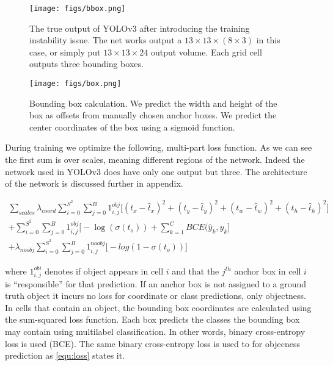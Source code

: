 \bigskip
\begin{figure}[!htbp]
  \centering
  \texttt{[image: figs/bbox.png]}
  \caption[The true output of YOLOv3]{The true output of YOLOv3 after introducing the training instability issue. The net works output a $ 13 \times 13 \times (8 \times 3)$ in this case, or simply put $13 \times 13 \times 24$ output volume. Each grid cell outputs three bounding boxes.}\label{fig:true_yolo_output}
\end{figure}

\begin{figure}[H]
  \centering
  \texttt{[image: figs/box.png]}
  \caption[Bounding box calculation]{Bounding box calculation. We predict the width and height of the box as offsets from manually chosen anchor boxes. We predict the center
    coordinates of the box using a sigmoid function.}\label{fig:bbox_calculation}
\end{figure}

During training we optimize the following, multi-part loss function. As we can see the first sum is over scales, meaning different regions of the network. Indeed the network used in YOLOv3 does have only one output but three. The architecture of the network is discussed further in appendix.

\begin{multline}
  \label{equ:loss}
  \sum_{scales} \lambda_{coord} \sum_{i=0}^{S^2}  \sum_{j=0}^{B} {1}^{obj}_{i,j}  \big[ (t_x - \hat{t}_x)^2  +  (t_y - \hat{t}_y)^2  +  (t_w - \hat{t}_w)^2  +  (t_h - \hat{t}_h)^2  \big] \\
+ \sum_{i=0}^{S^2}  \sum_{j=0}^{B} {1}^{obj}_{i,j} \big[ - \log(\sigma(t_o))  + \sum_{k=1}^{C} BCE(\hat{y}_k, y_k \big]   \\
+ \lambda_{noobj} \sum_{i=0}^{S^2}  \sum_{j=0}^{B} {1}^{noobj}_{i,j}  \big[ -log(1-\sigma(t_o))  \big]
\end{multline}

where $1^{obi}_{i, j}$ denotes if object appears in cell $i$ and that the $j^{th}$ anchor box in cell $i$ is “responsible” for that prediction.
If an anchor box is not assigned to a ground truth object it incurs no loss for coordinate or class predictions, only objectness.
In cells that contain an object, the bounding box coordinates are calculated using the sum-squared loss function.
Each box predicts the classes the bounding box may contain using multilabel classification. In other words, binary cross-entropy loss is used (BCE).
The same binary cross-entropy loss is used to for objecness prediction as \cref{equ:loss} states it.

